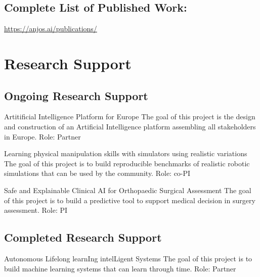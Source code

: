 \documentclass[a4paper]{nihbiosketch}
\begin{document}
\subsection*{Complete List of Published Work:}
\url{https://anjos.ai/publications/}

\section{Research Support}

\subsection*{Ongoing Research Support}

{Artitificial Intelligence Platform for Europe}
{The goal of this project is the design and construction of an Artificial
    Intelligence platform assembling all stakeholders in Europe.}
{Role: Partner}

\bigskip

{Learning physical manipulation skills with simulators using realistic variations}
{The goal of this project is to build reproducible benchmarks of realistic
robotic simulations that can be used by the community.}
{Role: co-PI}

\bigskip

{Safe and Explainable Clinical AI for Orthopaedic Surgical Assessment}
{The goal of this project is to build a predictive tool to support medical
decision in surgery assessment.}
{Role: PI}

\subsection*{Completed Research Support}

{Autonomous Lifelong learnIng intelLigent Systems}
{The goal of this project is to build machine learning systems that can learn
through time.}
{Role: Partner}
\end{document}
